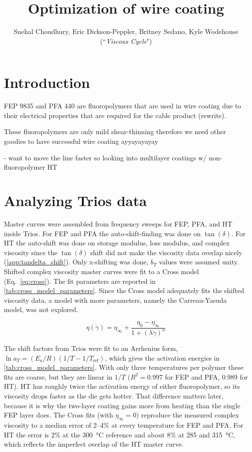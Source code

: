 \documentclass[11pt]{article}
\title{Optimization of wire coating}
\author{Snehal Choudhury, Eric Dickson-Peppler, Britney Sedano, Kyle Wodehouse \\(``\textit{Viscous Cycle}")}
\date{}
\begin{document}
\maketitle


\section*{Introduction}
FEP 9835 and PFA 440 are fluoropolymers that are used in wire coating due to their electrical properties that are required for the cable product (rewrite).

These fluoropolymers are only mild shear-thinning therefore we need other goodies to have successful wire coating ayyayayayay

- want to move the line faster so looking into multilayer coatings w/ non-fluoropolymer HT




\section*{Analyzing Trios data}

Master curves were assembled from frequency sweeps for FEP, PFA, and HT inside Trios. For FEP and PFA the auto-shift-finding was done on $\tan(\delta)$. For HT the auto-shift was done on storage modulus, loss modulus, and complex viscosity since the $\tan(\delta)$ shift did not make the viscosity data overlap nicely (\cref{app:tandelta_shift}). Only x-shifting was done,  $b_T$ values were assumed unity. Shifted complex viscosity master curves were fit to a Cross model\cite{cross_rheology_1965} (Eq.~\ref{eq:cross}). The fit parameters are reported in \cref{tab:cross_model_parameters}. Since the Cross model adequately fits the shifted viscosity data, a model with more parameters, namely the Carreau-Yasuda model, was not explored.

\begin{equation}
    \eta(\dot{\gamma}) = \eta_{\infty} + \frac{\eta_{0} - \eta_{\infty}}{1 + (\lambda \dot{\gamma})^{n}}
    \label{eq:cross}
\end{equation}

The shift factors from Trios were fit to an Arrhenius form, $\ln a_T = (E_a/R)(1/T - 1/T_\text{ref})$, which gives the activation energies in \cref{tab:cross_model_parameters}. With only three temperatures per polymer these fits are coarse, but they are linear in $1/T$ ($R^2 = 0.997$ for FEP and PFA, $0.989$ for HT). HT has roughly twice the activation energy of either fluoropolymer, so its viscosity drops faster as the die gets hotter. That difference matters later, because it is why the two-layer coating gains more from heating than the single FEP layer does. The Cross fits (with $\eta_\infty = 0$) reproduce the measured complex viscosity to a median error of 2--4\% at every temperature for FEP and PFA. For HT the error is 2\% at the 300~°C reference and about 8\% at 285 and 315~°C, which reflects the imperfect overlap of the HT master curve.
\end{document}
